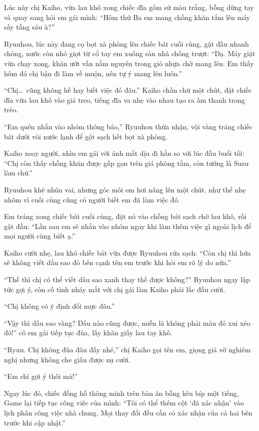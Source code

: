 \documentclass[../main.tex]{subfiles}
\begin{document}
Lúc này chị Kaiho, vừa lau khô xong chiếc đĩa gốm sứ màu trắng, bỗng dừng tay và quay sang hỏi em gái mình: ``Hôm thứ Ba em mang chồng khăn tắm lên máy sấy tầng sáu à?''

Ryuuhou, lúc này đang cọ bọt xà phòng lên chiếc bát cuối cùng, gật đầu nhanh chóng, nước còn nhỏ giọt từ cổ tay em xuống sàn nhà chống trượt: ``Dạ. Máy giặt vừa chạy xong, khăn ướt vẫn nằm nguyên trong giỏ nhựa chờ mang lên. Em thấy hôm đó chị bận đi làm về muộn, nên tự ý mang lên luôn.''

``Chị\dots\ cũng không hề hay biết việc đó đâu.'' Kaiho chần chừ một chút, đặt chiếc đĩa vừa lau khô vào giá treo, tiếng đĩa va nhẹ vào nhau tạo ra âm thanh trong trẻo.

``Em quên nhắn vào nhóm thông báo,'' Ryuuhou thừa nhận, vội vàng tráng chiếc bát dưới vòi nước lạnh để gột sạch hết bọt xà phòng.

Kaiho xoay người, nhìn em gái với ánh mắt dịu đi hẳn so với lúc đầu buổi tối: ``Chị còn thấy chồng khăn được gấp gọn trên giá phòng tắm, còn tưởng là Suzu làm chứ.''

Ryuuhou khẽ nhún vai, nhưng góc môi em hơi nâng lên một chút, như thể nhẹ nhõm vì cuối cùng cũng có người biết em đã làm việc đó.

Em tráng xong chiếc bát cuối cùng, đặt nó vào chồng bát sạch chờ lau khô, rồi gật đầu: ``Lần sau em sẽ nhắn vào nhóm ngay khi làm thêm việc gì ngoài lịch để mọi người cùng biết ạ.''

Kaiho cười nhẹ, lau khô chiếc bát vừa được Ryuuhou rửa sạch: ``Còn chị thì hứa sẽ không viết dấu sao đỏ bên cạnh tên em trước khi hỏi em rõ lý do nữa.''

``Thế thì chị có thể viết dấu sao xanh thay thế được không?'' Ryuuhou ngay lập tức gợi ý, còn cố tình nháy mắt với chị gái làm Kaiho phải lắc đầu cười.

``Chị không có ý định đổi mực đâu.''

``Vậy thì dấu sao vàng? Dấu nào cũng được, miễn là không phải màu đỏ xui xẻo đó!'' cô em gái tiếp tục đùa, lấy khăn giấy lau tay khô.

``Ryuu. Chị không đùa đâu đấy nhé,'' chị Kaiho gọi tên em, giọng giả vờ nghiêm nghị nhưng không che giấu được nụ cười.

``Em chỉ gợi ý thôi mà!''

Ngay lúc đó, chiếc đồng hồ thông minh trên bàn ăn bỗng kêu bíp một tiếng, Game lại tiếp tục công việc của mình: ``Tôi có thể thêm cột `đã xác nhận' vào lịch phân công việc nhà chung. Mọi thay đổi đều cần có xác nhận của cả hai bên trước khi cập nhật.''
\end{document}
